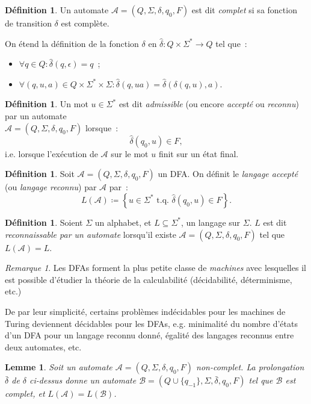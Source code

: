\documentclass{article}
\newtheorem{lem}[thm]{Lemme}
\theoremstyle{definition}
\newtheorem{déf}[thm]{Définition}
\theoremstyle{remark}
\newtheorem*{rmq}{Remarque}
\newcommand{\tq}{\text{ t.q. }}
\newcommand{\automaton}{(Q, \Sigma, \delta, q_0, F)}
\begin{document}
	\begin{déf} Un automate $\mathcal A = \automaton$ est dit \textit{complet} si sa fonction de transition $\delta$ est complète.
	\end{déf}

	On étend la définition de la fonction $\delta$ en $\hat \delta : Q \times \Sigma^* \to Q$ tel que~:
	\begin{itemize}
		\item $\forall q \in Q : \hat \delta(q, \epsilon) = q$~;
		\item $\forall (q, u, a) \in Q \times \Sigma^* \times \Sigma : \hat \delta(q, ua) = \hat \delta(\delta(q, u), a)$.
	\end{itemize}

	\begin{déf} Un mot $u \in \Sigma^*$ est dit \textit{admissible} (ou encore \textit{accepté} ou \textit{reconnu}) par un automate\\
	$\mathcal A = \automaton$ lorsque~:
	\[\hat \delta(q_0, u) \in F,\]
	i.e. lorsque l'exécution de $\mathcal A$ sur le mot $u$ finit sur un état final.
	\end{déf}

	\begin{déf} Soit $\mathcal A = \automaton$ un DFA. On définit le \textit{langage accepté} (ou \textit{langage reconnu}) par $\mathcal A$ par~:
	\[L(\mathcal A) \coloneqq \left\{u \in \Sigma^* \tq \hat \delta(q_0, u) \in F\right\}.\]
	\end{déf}

	\begin{déf} Soient $\Sigma$ un alphabet, et $L \subseteq \Sigma^*$, un langage sur $\Sigma$. $L$ est dit \textit{reconnaissable par un automate}
	lorsqu'il existe $\mathcal A = \automaton$ tel que $L(\mathcal A) = L$.
	\end{déf}

	\begin{rmq} Les DFAs forment la plus petite classe de \textit{machines} avec lesquelles il est possible d'étudier la théorie de la calculabilité (décidabilité,
	déterminisme, etc.)

	De par leur simplicité, certains problèmes indécidables pour les machines de Turing deviennent décidables pour les DFAs, e.g. minimalité du nombre d'états
	d'un DFA pour un langage reconnu donné, égalité des langages reconnus entre deux automates, etc.
	\end{rmq}

	\begin{lem}\label{lem:complétion} Soit un automate $\mathcal A = \automaton$ non-complet. La prolongation $\bar \delta$ de $\delta$ ci-dessus donne un automate
	$\mathcal B = (Q \cup \{q_{-1}\}, \Sigma, \bar \delta, q_0, F)$ tel que $\mathcal B$ est complet, et $L(\mathcal A) = L(\mathcal B)$.
	\end{lem}
\end{document}
